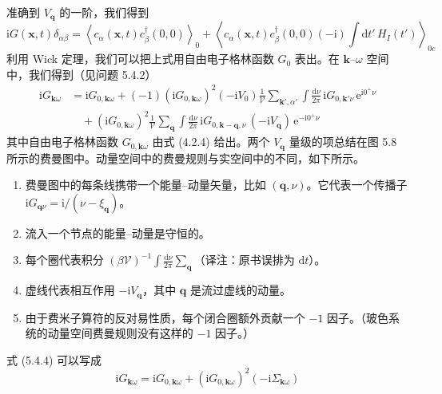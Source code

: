 
准确到 $V_{\pmb{q}}$ 的一阶，我们得到
\begin{equation*}
\mathrm{i}G(\pmb{x},t)\delta_{\alpha\beta}=\left\langle c_{\alpha}(\pmb{x},t)c_{\beta}^{\dagger}(0,0)\right\rangle_{0}+\left\langle c_{\alpha}(\pmb{x},t)c_{\beta}^{\dagger}(0,0)(-\mathrm{i})\int \mathrm{d}t'\,H_{I}(t')\right\rangle_{0c}
\end{equation*}
利用 Wick 定理，我们可以把上式用自由电子格林函数 $G_{0}$ 表出。在 $\pmb{k}$--$\omega$ 空间中，我们得到（见问题 5.4.2）
\begin{align*}
\mathrm{i}G_{\pmb{k}\omega} &= \mathrm{i}G_{0,\pmb{k}\omega}+(-1)(\mathrm{i}G_{0,\pmb{k}\omega})^{2}(-\mathrm{i}V_{0})\frac{1}{\mathcal{V}}\sum_{\pmb{k}',\alpha'}\int \frac{\mathrm{d}\nu}{2\pi}\,\mathrm{i}G_{0,\pmb{k}'\nu}\,\mathrm{e}^{\mathrm{i}0^{+}\nu}\\
&\quad +(\mathrm{i}G_{0,\pmb{k}\omega})^{2}\frac{1}{\mathcal{V}}\sum_{\pmb{q}}\int \frac{\mathrm{d}\nu}{2\pi}\,\mathrm{i}G_{0,\pmb{k}-\pmb{q},\nu}\,(-\mathrm{i}V_{\pmb{q}})\,\mathrm{e}^{-\mathrm{i}0^{+}\nu} \tag{5.4.4}
\end{align*}
其中自由电子格林函数 $G_{0,\pmb{k}\omega}$ 由式 (4.2.4) 给出。两个 $V_{\pmb{q}}$ 量级的项总结在图 5.8 所示的费曼图中。动量空间中的费曼规则与实空间中的不同，如下所示。
\begin{enumerate}
\item[(a)] 费曼图中的每条线携带一个能量--动量矢量，比如 $(\pmb{q},\nu)$。它代表一个传播子 $\mathrm{i}G_{\pmb{q}\nu}=\mathrm{i}/(\nu-\xi_{\pmb{q}})$。
\item[(b)] 流入一个节点的能量--动量是守恒的。
\item[(c)] 每个圈代表积分 $(\beta\mathcal{V})^{-1}\int \frac{\mathrm{d}\nu}{2\pi}\sum_{\pmb{q}}$（译注：原书误排为 $\mathrm{d}t$）。
\item[(d)] 虚线代表相互作用 $-\mathrm{i}V_{\pmb{q}}$，其中 $\pmb{q}$ 是流过虚线的动量。
\item[(e)] 由于费米子算符的反对易性质，每个闭合圈额外贡献一个 $-1$ 因子。（玻色系统的动量空间费曼规则没有这样的 $-1$ 因子。）
\end{enumerate}

式 (5.4.4) 可以写成
\begin{equation*}
\mathrm{i}G_{\pmb{k}\omega}=\mathrm{i}G_{0,\pmb{k}\omega}+(\mathrm{i}G_{0,\pmb{k}\omega})^{2}(-\mathrm{i}\Sigma_{\pmb{k}\omega})
\end{equation*}

